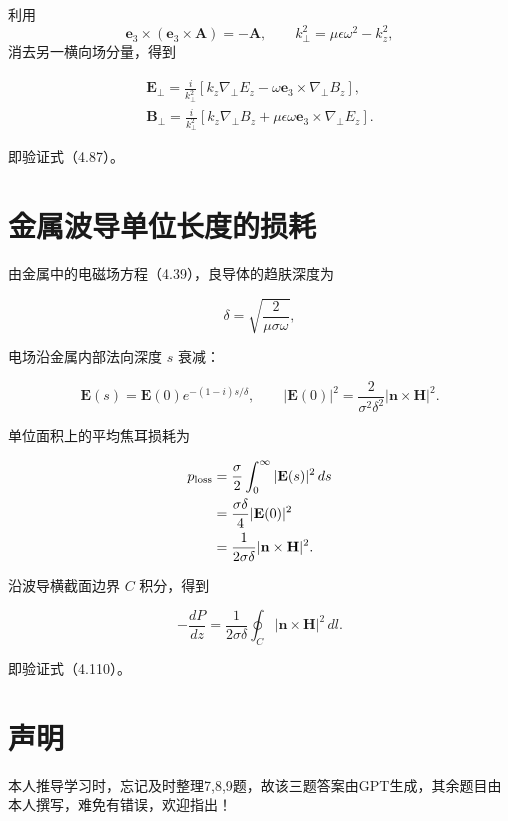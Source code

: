 \documentclass{article}
\begin{document}
利用
\[
\mathbf e_3\times(\mathbf e_3\times\mathbf A)
=-\mathbf A,
\qquad
k_\perp^2=\mu\epsilon\omega^2-k_z^2,
\]
消去另一横向场分量，得到

\begin{align}
\boxed{
\mathbf E_\perp
=\frac{i}{k_\perp^2}
\left[
k_z\nabla_\perp E_z
-\omega\mathbf e_3\times\nabla_\perp B_z
\right]
},\\[6pt]
\boxed{
\mathbf B_\perp
=\frac{i}{k_\perp^2}
\left[
k_z\nabla_\perp B_z
+\mu\epsilon\omega\mathbf e_3\times\nabla_\perp E_z
\right]
}.
\end{align}

即验证式（4.87）。

\section{金属波导单位长度的损耗}

由金属中的电磁场方程（4.39），良导体的趋肤深度为

\[
\delta=\sqrt{\frac{2}{\mu\sigma\omega}},
\]

电场沿金属内部法向深度 $s$ 衰减：

\[
\mathbf E(s)=\mathbf E(0)e^{-(1-i)s/\delta},
\qquad
|\mathbf E(0)|^2
=\frac{2}{\sigma^2\delta^2}
|\mathbf n\times\mathbf H|^2.
\]

单位面积上的平均焦耳损耗为

\begin{align}
p_{\rm loss}
&=\frac{\sigma}{2}\int_0^\infty
|\mathbf E(s)|^2\,ds\\
&=\frac{\sigma\delta}{4}|\mathbf E(0)|^2\\
&=\frac{1}{2\sigma\delta}
|\mathbf n\times\mathbf H|^2.
\end{align}

沿波导横截面边界 $C$ 积分，得到

\[
\boxed{
-\frac{dP}{dz}
=\frac{1}{2\sigma\delta}
\oint_C|\mathbf n\times\mathbf H|^2\,dl
}.
\]

即验证式（4.110）。

\section{声明}
本人推导学习时，忘记及时整理7,8,9题，故该三题答案由GPT生成，其余题目由本人撰写，难免有错误，欢迎指出！
\end{document}
